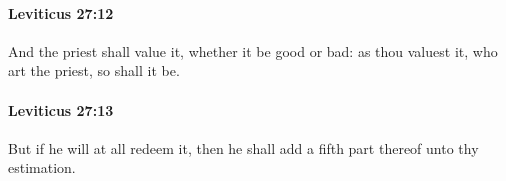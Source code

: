 		\paragraph{Leviticus 27:12} %
			\label{LEVITICUS-27-12}

			And the priest shall value it, whether it be good or bad: as thou valuest it, who art the priest, so shall it be.


		\paragraph{Leviticus 27:13} %
			\label{LEVITICUS-27-13}

			But if he will at all redeem it, then he shall add a fifth part thereof unto thy estimation.


